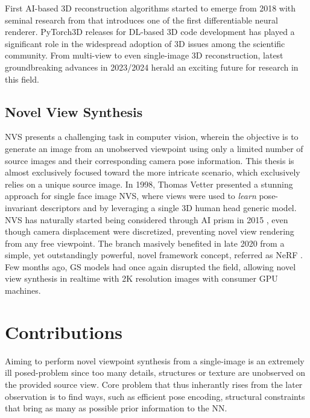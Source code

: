  First \ac{AI}-based 3D reconstruction algorithms started to emerge from 2018 with seminal research from \citep{kato2018neural} that introduces one of the first differentiable neural renderer. PyTorch3D \citep{ravi2020pytorch3d} releases for  \ac{DL}-based 3D code development has played a significant role in the widespread adoption of 3D issues among the scientific community. From multi-view \citep{li2023neuralangelo} to even single-image \citep{voleti2024sv3d} 3D reconstruction, latest groundbreaking advances in 2023/2024 herald an exciting future for research in this field. 

\subsection{Novel View Synthesis}
\ac{NVS} presents a challenging task in computer vision, wherein the objective is to generate an image from an unobserved viewpoint using only a limited number of source images and their corresponding camera pose information. This thesis is almost exclusively focused toward the more intricate scenario, which exclusively relies on a unique source image. In 1998, Thomas Vetter presented a stunning approach \cite{vetter1998synthesis} for single face image \ac{NVS}, where views were used to \textit{learn} pose-invariant descriptors and by leveraging a single 3D human head generic model. \ac{NVS} has naturally started being considered through \ac{AI} prism in 2015 \citep{yang2015weakly}, even though camera displacement were discretized, preventing novel view rendering from any free viewpoint. The branch masively benefited in late 2020 from a simple, yet outstandingly powerful, novel framework concept, referred as \ac{NeRF} \cite{mildenhall2020nerf}. Few months ago, \ac{GS} models had once again disrupted the field, allowing novel view synthesis in realtime with 2K resolution images with consumer \ac{GPU} machines. 


\section{Contributions}
Aiming to perform novel viewpoint synthesis from a single-image is an extremely ill posed-problem since too many details, structures or texture are unobserved on the provided source view. Core problem that thus inherantly rises from the later observation is to find ways, such as efficient pose encoding, structural constraints that bring as many as possible prior information to the \ac{NN}. 

